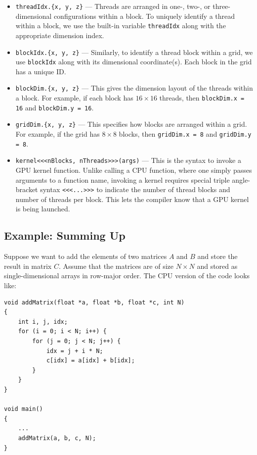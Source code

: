 \documentclass[12pt]{book}
\begin{document}
\begin{itemize}
    \item \texttt{threadIdx.\{x, y, z\}} — Threads are arranged in one-, two-, or three-dimensional configurations within a block. To uniquely identify a thread within a block, we use the built-in variable \texttt{threadIdx} along with the appropriate dimension index.
    
    \item \texttt{blockIdx.\{x, y, z\}} — Similarly, to identify a thread block within a grid, we use \texttt{blockIdx} along with its dimensional coordinate(s). Each block in the grid has a unique ID.

    \item \texttt{blockDim.\{x, y, z\}} — This gives the dimension layout of the threads within a block. For example, if each block has $16 \times 16$ threads, then \texttt{blockDim.x = 16} and \texttt{blockDim.y = 16}.
    
    \item \texttt{gridDim.\{x, y, z\}} — This specifies how blocks are arranged within a grid. For example, if the grid has $8 \times 8$ blocks, then \texttt{gridDim.x = 8} and \texttt{gridDim.y = 8}.
    
    \item \texttt{kernel<<<nBlocks, nThreads>>>(args)} — This is the syntax to invoke a GPU kernel function. Unlike calling a CPU function, where one simply passes arguments to a function name, invoking a kernel requires special triple angle-bracket syntax \texttt{<<<...>>>} to indicate the number of thread blocks and number of threads per block. This lets the compiler know that a GPU kernel is being launched.
\end{itemize}

\subsection{Example: Summing Up}
Suppose we want to add the elements of two matrices $A$ and $B$ and store the result in matrix $C$. Assume that the matrices are of size $N \times N$ and stored as single-dimensional arrays in row-major order. The CPU version of the code looks like:

\begin{lstlisting}[style=cppstyle]
void addMatrix(float *a, float *b, float *c, int N)
{
    int i, j, idx;
    for (i = 0; i < N; i++) {
        for (j = 0; j < N; j++) {
            idx = j + i * N;
            c[idx] = a[idx] + b[idx];
        }
    }
}

void main()
{
    ...
    addMatrix(a, b, c, N);
}
\end{lstlisting}
\end{document}
